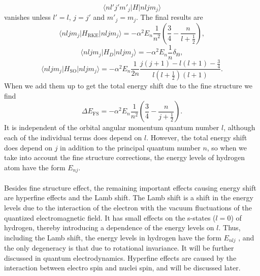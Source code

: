 \[\langle n l' j' m'_j | H | n l j m_j\rangle\]
vanishes unless $l'=l$, $j=j'$ and $m'_j = m_j$. The final results are
\[\langle n l j m_j | H_{\mathrm{RKE}} | n l j m_j\rangle = -\alpha^2 E_n \frac{1}{n^2} \left(\frac{3}{4} - \frac{n}{l+\frac{1}{2}} \right),\]
\[\langle n l j m_j | H_{D} | n l j m_j\rangle = -\alpha^2 E_n \frac{1}{n}\delta_{l0},\]
\[\langle n l j m_j | H_{\mathrm{SO}} | n l j m_j\rangle = -\alpha^2 E_n \frac{1}{2n} \frac{j(j+1)-l(l+1)-\frac{3}{4}}{l(l+\frac{1}{2})(l+1)}.\]
When we add them up to get the total energy shift due to the fine structure we find
\[\Delta E_{\mathrm{FS}} = -\alpha^2 E_n \frac{1}{n^2} \left(\frac{3}{4} - \frac{n}{j+\frac{1}{2}} \right).\]
It is independent of the orbital angular momentum quantum number $l$, although each of the individual terms does depend on $l$. However, the total energy shift does depend on $j$ in addition to the principal quantum number $n$, so when we take into account the fine structure corrections, the energy levels of hydrogen atom have the form $E_{nj}$.\\ \\
Besides fine structure effect, the remaining important effects causing energy shift are hyperfine effects and the Lamb shift.
The Lamb shift is a shift in the energy levels due to the interaction of the electron with the vacuum fluctuations of the quantized electromagnetic field. It has small effects on the s-states ($l = 0$) of hydrogen, thereby introducing a dependence of the energy levels on $l$. Thus, including the Lamb shift, the energy levels in hydrogen have the form $E_{nlj}$ , and the only degeneracy is that due to rotational invariance. It will be further discussed in quantum electrodynamics.
Hyperfine effects are caused by the interaction between electro spin and nuclei spin, and will be discussed later.


